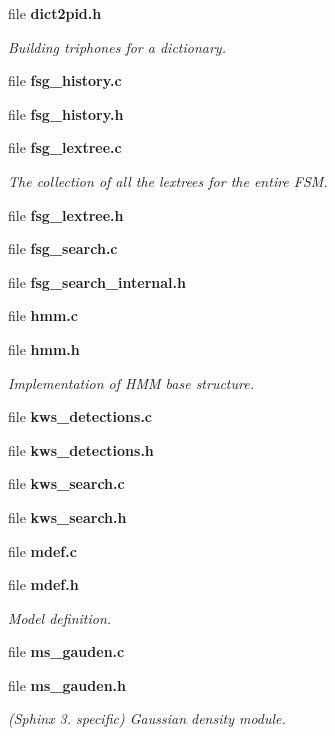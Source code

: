 \begin{DoxyCompactItemize}
\begin{DoxyCompactList}
\begin{DoxyItemize}
\end{DoxyItemize}\end{DoxyCompactList}\item 
file {\bf dict2pid.\-h}
\begin{DoxyCompactList}\small\item\em Building triphones for a dictionary. \end{DoxyCompactList}\item 
file {\bfseries fsg\-\_\-history.\-c}
\item 
file {\bfseries fsg\-\_\-history.\-h}
\item 
file {\bf fsg\-\_\-lextree.\-c}
\begin{DoxyCompactList}\small\item\em The collection of all the lextrees for the entire F\-S\-M. \end{DoxyCompactList}\item 
file {\bfseries fsg\-\_\-lextree.\-h}
\item 
file {\bfseries fsg\-\_\-search.\-c}
\item 
file {\bfseries fsg\-\_\-search\-\_\-internal.\-h}
\item 
file {\bfseries hmm.\-c}
\item 
file {\bf hmm.\-h}
\begin{DoxyCompactList}\small\item\em Implementation of H\-M\-M base structure. \end{DoxyCompactList}\item 
file {\bfseries kws\-\_\-detections.\-c}
\item 
file {\bfseries kws\-\_\-detections.\-h}
\item 
file {\bfseries kws\-\_\-search.\-c}
\item 
file {\bfseries kws\-\_\-search.\-h}
\item 
file {\bfseries mdef.\-c}
\item 
file {\bf mdef.\-h}
\begin{DoxyCompactList}\small\item\em Model definition. \end{DoxyCompactList}\item 
file {\bfseries ms\-\_\-gauden.\-c}
\item 
file {\bf ms\-\_\-gauden.\-h}
\begin{DoxyCompactList}\small\item\em (Sphinx 3. specific) Gaussian density module. \end{DoxyCompactList}\item 

\end{DoxyCompactItemize}
